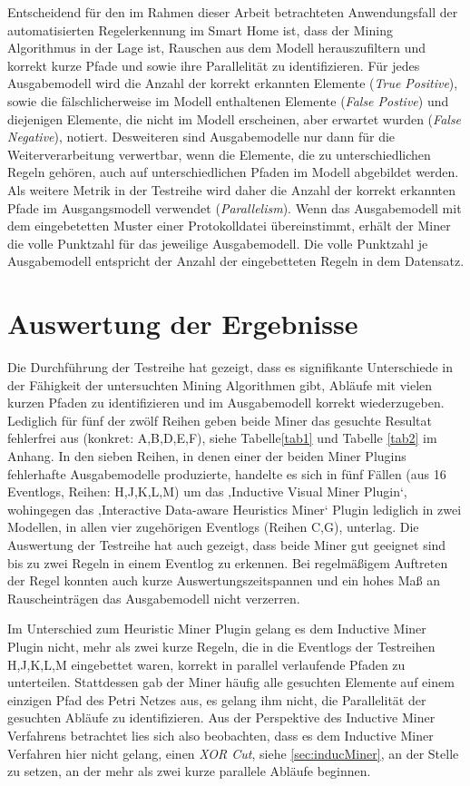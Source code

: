 Entscheidend für den im Rahmen dieser Arbeit betrachteten Anwendungsfall der automatisierten Regelerkennung im Smart Home ist, dass der Mining Algorithmus in der Lage ist, Rauschen aus dem Modell herauszufiltern und korrekt kurze Pfade und sowie ihre Parallelität zu identifizieren. Für jedes Ausgabemodell wird die Anzahl der korrekt erkannten Elemente (\textit{True Positive}), sowie die fälschlicherweise im Modell enthaltenen Elemente (\textit{False Postive}) und diejenigen Elemente, die nicht im Modell erscheinen, aber erwartet wurden (\textit{False Negative}), notiert. 
Desweiteren sind Ausgabemodelle nur dann für die Weiterverarbeitung verwertbar, wenn die Elemente, die zu unterschiedlichen Regeln gehören, auch auf unterschiedlichen Pfaden im Modell abgebildet werden. Als weitere Metrik in der Testreihe wird daher die Anzahl der korrekt erkannten Pfade im Ausgangsmodell verwendet (\textit{Parallelism}). Wenn das Ausgabemodell mit dem eingebetetten Muster einer Protokolldatei übereinstimmt, erhält der Miner die volle Punktzahl für das jeweilige Ausgabemodell. Die volle Punktzahl je Ausgabemodell entspricht der Anzahl der eingebetteten Regeln in dem Datensatz.

\section{Auswertung der Ergebnisse}\label{sec:res}
Die Durchführung der Testreihe hat gezeigt, dass es signifikante Unterschiede in der Fähigkeit der untersuchten Mining Algorithmen gibt, Abläufe mit vielen kurzen Pfaden zu identifizieren und im Ausgabemodell korrekt wiederzugeben. Lediglich für fünf der zwölf Reihen geben beide Miner das gesuchte Resultat fehlerfrei aus (konkret: A,B,D,E,F), siehe Tabelle\ref{tab1} und Tabelle \ref{tab2} im Anhang. In den sieben Reihen, in denen einer der beiden Miner Plugins fehlerhafte Ausgabemodelle produzierte, handelte es sich in fünf Fällen (aus 16 Eventlogs, Reihen: H,J,K,L,M) um das ‚Inductive Visual Miner Plugin‘, wohingegen das ‚Interactive Data-aware Heuristics Miner‘ Plugin lediglich in zwei Modellen, in allen vier zugehörigen Eventlogs (Reihen C,G), unterlag. Die Auswertung der Testreihe hat auch gezeigt, dass beide Miner gut geeignet sind bis zu zwei Regeln in einem Eventlog zu erkennen. Bei regelmäßigem Auftreten der Regel konnten auch kurze Auswertungszeitspannen und ein hohes Maß an Rauscheinträgen das Ausgabemodell nicht verzerren.

Im Unterschied zum Heuristic Miner Plugin gelang es dem Inductive Miner Plugin nicht, mehr als zwei kurze Regeln, die in die Eventlogs der Testreihen H,J,K,L,M eingebettet waren, korrekt in parallel verlaufende Pfaden zu unterteilen. Stattdessen gab der Miner häufig alle gesuchten Elemente auf einem einzigen Pfad des Petri Netzes aus, es gelang ihm nicht, die Parallelität der gesuchten Abläufe zu identifizieren. 
Aus der Perspektive des Inductive Miner Verfahrens betrachtet lies sich also beobachten, dass es dem Inductive Miner Verfahren hier nicht gelang, einen \textit{XOR Cut}, siehe \ref{sec:inducMiner}, an der Stelle zu setzen, an der mehr als zwei kurze parallele Abläufe beginnen. 

